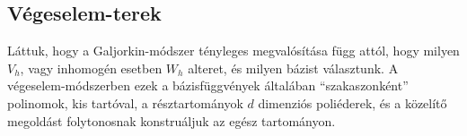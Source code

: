  

	
	


	



 
\subsection{Végeselem-terek}

Láttuk, hogy a Galjorkin-módszer tényleges megvalósítása függ attól, hogy milyen $V_h$, vagy inhomogén esetben $W_h$ alteret, és milyen bázist választunk. A végeselem-módszerben ezek a bázisfüggvények általában ``szakaszonként'' polinomok, kis tartóval, a résztartományok $d$ dimenziós poliéderek, és a közelítő megoldást folytonosnak konstruáljuk az egész tartományon.


